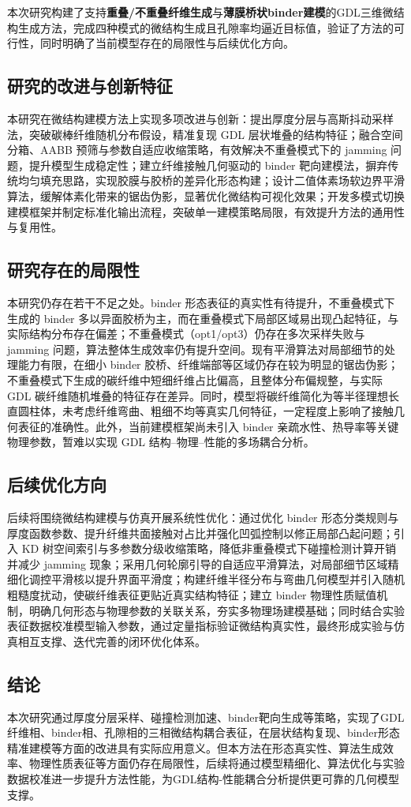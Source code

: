 本次研究构建了支持\textbf{重叠/不重叠纤维生成}与\textbf{薄膜桥状binder建模}的GDL三维微结构生成方法，完成四种模式的微结构生成且孔隙率均逼近目标值，验证了方法的可行性，同时明确了当前模型存在的局限性与后续优化方向。

\subsection{研究的改进与创新特征}
本研究在微结构建模方法上实现多项改进与创新：提出厚度分层与高斯抖动采样法，突破碳棒纤维随机分布假设，精准复现 GDL 层状堆叠的结构特征；融合空间分箱、AABB 预筛与参数自适应收缩策略，有效解决不重叠模式下的 jamming 问题，提升模型生成稳定性；建立纤维接触几何驱动的 binder 靶向建模法，摒弃传统均匀填充思路，实现胶膜与胶桥的差异化形态构建；设计二值体素场软边界平滑算法，缓解体素化带来的锯齿伪影，显著优化微结构可视化效果；开发多模式切换建模框架并制定标准化输出流程，突破单一建模策略局限，有效提升方法的通用性与复用性。

\subsection{研究存在的局限性}
本研究仍存在若干不足之处。binder 形态表征的真实性有待提升，不重叠模式下生成的 binder 多以异面胶桥为主，而在重叠模式下局部区域易出现凸起特征，与实际结构分布存在偏差；不重叠模式（opt1/opt3）仍存在多次采样失败与 jamming 问题，算法整体生成效率仍有提升空间。现有平滑算法对局部细节的处理能力有限，在细小 binder 胶桥、纤维端部等区域仍存在较为明显的锯齿伪影；不重叠模式下生成的碳纤维中短细纤维占比偏高，且整体分布偏规整，与实际 GDL 碳纤维随机堆叠的特征存在差异。同时，模型将碳纤维简化为等半径理想长直圆柱体，未考虑纤维弯曲、粗细不均等真实几何特征，一定程度上影响了接触几何表征的准确性。此外，当前建模框架尚未引入 binder 亲疏水性、热导率等关键物理参数，暂难以实现 GDL 结构–物理–性能的多场耦合分析。

\subsection{后续优化方向}
后续将围绕微结构建模与仿真开展系统性优化：通过优化 binder 形态分类规则与厚度函数参数、提升纤维共面接触对占比并强化凹弧控制以修正局部凸起问题；引入 KD 树空间索引与多参数分级收缩策略，降低非重叠模式下碰撞检测计算开销并减少 jamming 现象；采用几何轮廓引导的自适应平滑算法，对局部细节区域精细化调控平滑核以提升界面平滑度；构建纤维半径分布与弯曲几何模型并引入随机粗糙度扰动，使碳纤维表征更贴近真实结构特征；建立 binder 物理性质赋值机制，明确几何形态与物理参数的关联关系，夯实多物理场建模基础；同时结合实验表征数据校准模型输入参数，通过定量指标验证微结构真实性，最终形成实验与仿真相互支撑、迭代完善的闭环优化体系。

\subsection{结论}
本次研究通过厚度分层采样、碰撞检测加速、binder靶向生成等策略，实现了GDL纤维相、binder相、孔隙相的三相微结构耦合表征，在层状结构复现、binder形态精准建模等方面的改进具有实际应用意义。但本方法在形态真实性、算法生成效率、物理性质表征等方面仍存在局限性，后续将通过模型精细化、算法优化与实验数据校准进一步提升方法性能，为GDL结构-性能耦合分析提供更可靠的几何模型支撑。